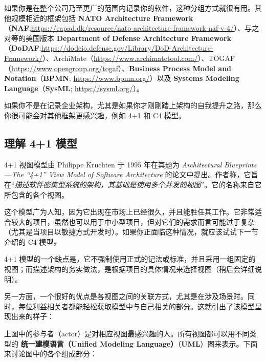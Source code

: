 \label{idx:184}
\label{idx:185}
\label{idx:186}
如果你是在整个公司乃至更广的范围内记录你的软件，这种分组方式就很有用。其他规模相近的框架包括 \textbf{NATO Architecture Framework }（\textbf{NAF};\href{https://eapad.dk/resource/nato-architecture-framework-naf-v-4/}{https://eapad.dk/resource/nato-architecture-framework-naf-v-4/}）、与之对等的美国版本 \textbf{Department of Defense Architecture Framework}（\textbf{DoDAF};\href{https://dodcio.defense.gov/Library/DoD-Architecture-Framework/}{https://dodcio.defense.gov/Library/DoD-Architecture-Framework/}）、ArchiMate（\href{https://www.archimatetool.com/}{https://www.archimatetool.com/}）、TOGAF（\href{https://www.opengroup.org/togaf}{https://www.opengroup.org/togaf}）、\textbf{Business Process Model and Notation}（\textbf{BPMN}; \href{https://www.bpmn.org/}{https://www.bpmn.org/}）以及 \textbf{Systems Modeling Language}（\textbf{SysML}; \href{https://sysml.org/}{https://sysml.org/}）。

如果你不是在记录企业架构，尤其是如果你才刚刚踏上架构的自我提升之路，那么你很可能会对其他框架更感兴趣，例如 4+1 和 C4 模型。

\subsection{理解 4+1 模型}

4+1 视图模型由 Philippe Kruchten 于 1995 年在其题为 \emph{Architectural Blueprints—The “4+1” View Model of Software Architecture} 的论文中提出。作者称，它旨在“\emph{描述软件密集型系统的架构，其基础是使用多个并发的视图}”。它的名称来自它所包含的各个视图。

\label{idx:187}
\label{idx:188}
这个模型广为人知，因为它出现在市场上已经很久，并且能胜任其工作。它非常适合较大的项目，虽然也可以用于中小型项目，但对它们的需求而言可能过于复杂（尤其是当项目以敏捷方式开发时）。如果你正面临这种情况，就应该试试下一节介绍的 C4 模型。

4+1 模型的一个缺点是，它不强制使用正式的记法或标准，并且采用一组固定的视图；而描述架构的务实做法，是根据项目的具体情况来选择视图（稍后会详细说明）。

另一方面，一个很好的优点是各视图之间的关联方式，尤其是在涉及场景时。同时，每位利益相关者都能轻松获取模型中与自己相关的部分。这就引出了该模型呈现出来的样子：


\label{idx:189}
\label{idx:190}
\label{idx:191}
上图中的参与者（actor）是对相应视图最感兴趣的人。所有视图都可以用不同类型的 \textbf{统一建模语言（Unified Modeling Language）}（\textbf{UML}）图来表示。下面来讨论图中的各个组成部分：

